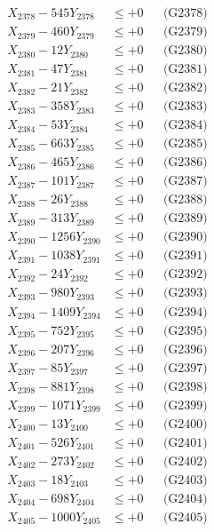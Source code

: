\documentclass[a4paper,10pt]{article}
\begin{document}
{\begin{align}
X_{2378} - 545Y_{2378} &\leq +0 && \text{(G2378)} \\
X_{2379} - 460Y_{2379} &\leq +0 && \text{(G2379)} \\
X_{2380} - 12Y_{2380} &\leq +0 && \text{(G2380)} \\
\allowbreak
X_{2381} - 47Y_{2381} &\leq +0 && \text{(G2381)} \\
X_{2382} - 21Y_{2382} &\leq +0 && \text{(G2382)} \\
X_{2383} - 358Y_{2383} &\leq +0 && \text{(G2383)} \\
X_{2384} - 53Y_{2384} &\leq +0 && \text{(G2384)} \\
X_{2385} - 663Y_{2385} &\leq +0 && \text{(G2385)} \\
X_{2386} - 465Y_{2386} &\leq +0 && \text{(G2386)} \\
X_{2387} - 101Y_{2387} &\leq +0 && \text{(G2387)} \\
X_{2388} - 26Y_{2388} &\leq +0 && \text{(G2388)} \\
X_{2389} - 313Y_{2389} &\leq +0 && \text{(G2389)} \\
X_{2390} - 1256Y_{2390} &\leq +0 && \text{(G2390)} \\
\allowbreak
X_{2391} - 1038Y_{2391} &\leq +0 && \text{(G2391)} \\
X_{2392} - 24Y_{2392} &\leq +0 && \text{(G2392)} \\
X_{2393} - 980Y_{2393} &\leq +0 && \text{(G2393)} \\
X_{2394} - 1409Y_{2394} &\leq +0 && \text{(G2394)} \\
X_{2395} - 752Y_{2395} &\leq +0 && \text{(G2395)} \\
X_{2396} - 207Y_{2396} &\leq +0 && \text{(G2396)} \\
X_{2397} - 85Y_{2397} &\leq +0 && \text{(G2397)} \\
X_{2398} - 881Y_{2398} &\leq +0 && \text{(G2398)} \\
X_{2399} - 1071Y_{2399} &\leq +0 && \text{(G2399)} \\
X_{2400} - 13Y_{2400} &\leq +0 && \text{(G2400)} \\
\allowbreak
X_{2401} - 526Y_{2401} &\leq +0 && \text{(G2401)} \\
X_{2402} - 273Y_{2402} &\leq +0 && \text{(G2402)} \\
X_{2403} - 18Y_{2403} &\leq +0 && \text{(G2403)} \\
X_{2404} - 698Y_{2404} &\leq +0 && \text{(G2404)} \\
X_{2405} - 1000Y_{2405} &\leq +0 && \text{(G2405)} \\

\end{align}}
\end{document}
